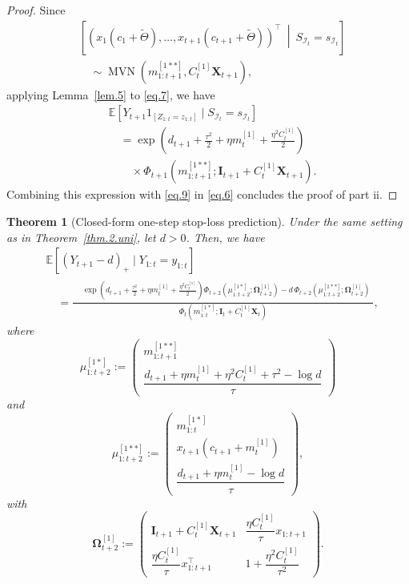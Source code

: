 \documentclass[11pt,authoryear]{elsarticle}
\def\E#1{{\mathbb E}\left[#1\right]}
\newtheorem{theorem}{Theorem}
\theoremstyle{nopunct}
\numberwithin{equation}{section}
\begin{document}
\begin{proof}
Since
\[
\begin{aligned}
&\left[
\left(
x_1(c_1+\widetilde{\Theta}),
\ldots,
x_{t+1}(c_{t+1}+\widetilde{\Theta})
\right)^\top
\ \middle|\
S_{\mathcal I_t}=s_{\mathcal I_t}
\right]\\
&\quad\sim
\operatorname{MVN}
\left(
m_{1:t+1}^{[1**]},
C_t^{[1]}\boldsymbol X_{t+1}
\right),
\end{aligned}
\]
applying Lemma~\ref{lem.5} to \eqref{eq.7}, we have
\[
\begin{aligned}
&\E{
Y_{t+1}1_{\left[Z_{1:t}=z_{1:t}\right]}
\mid
S_{\mathcal I_t}=s_{\mathcal I_t}
}\\
&\quad=
\exp\left(
d_{t+1}
+
\frac{\tau^2}{2}
+
\eta m_t^{[1]}
+
\frac{\eta^2C_t^{[1]}}{2}
\right)\\
&\qquad\times
\Phi_{t+1}
\left(
m_{1:t+1}^{[1**]};
\boldsymbol I_{t+1}
+
C_t^{[1]}\boldsymbol X_{t+1}
\right).
\end{aligned}
\]
Combining this expression with \eqref{eq.9} in \eqref{eq.6}
concludes the proof of part ii.
\end{proof}



\begin{theorem}[Closed-form one-step stop-loss prediction]
\label{thm.stop.loss.uni}
Under the same setting as in Theorem~\ref{thm.2.uni},
let \(d>0\). Then, we have
\begin{equation}\label{eq.stop.loss.prediction.uni}
\begin{aligned}
&\E{
(Y_{t+1}-d)_+
\mid
Y_{1:t}=y_{1:t}
}\\
&\quad=
\frac{
\begin{aligned}
&\exp\left(
d_{t+1}
+
\frac{\tau^2}{2}
+
\eta m_t^{[1]}
+
\frac{\eta^2C_t^{[1]}}{2}
\right)
\Phi_{t+2}
\left(
\mu_{1:t+2}^{[1*]};
\boldsymbol\Omega_{t+2}^{[1]}
\right)-
d\,
\Phi_{t+2}
\left(
\mu_{1:t+2}^{[1**]};
\boldsymbol\Omega_{t+2}^{[1]}
\right)
\end{aligned}
}{
\Phi_t
\left(
m_{1:t}^{[1*]};
\boldsymbol I_t
+
C_t^{[1]}\boldsymbol X_t
\right)
},
\end{aligned}
\end{equation}
where
\[
\mu_{1:t+2}^{[1*]}
:=
\begin{pmatrix}
m_{1:t+1}^{[1**]}\\[0.15cm]
\dfrac{
d_{t+1}+\eta m_t^{[1]}+\eta^2C_t^{[1]}+\tau^2-\log d
}{\tau}
\end{pmatrix}
\]
and
\[
\mu_{1:t+2}^{[1**]}
:=
\begin{pmatrix}
m_{1:t}^{[1*]}\\[0.1cm]
x_{t+1}(c_{t+1}+m_t^{[1]})\\[0.15cm]
\dfrac{
d_{t+1}+\eta m_t^{[1]}-\log d
}{\tau}
\end{pmatrix},
\]
with
\[
\boldsymbol\Omega_{t+2}^{[1]}
:=
\begin{pmatrix}
\boldsymbol I_{t+1}
+
C_t^{[1]}\boldsymbol X_{t+1}
&
\dfrac{\eta C_t^{[1]}}{\tau}x_{1:t+1}
\\[0.4cm]
\dfrac{\eta C_t^{[1]}}{\tau}x_{1:t+1}^{\top}
&
1+\dfrac{\eta^2C_t^{[1]}}{\tau^2}
\end{pmatrix}.
\]
\end{theorem}
\end{document}
